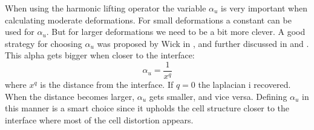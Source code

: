 When using the harmonic lifting operator the variable $\alpha_u$ is very important when calculating moderate deformations. For small deformations a constant can be used for $\alpha_u$. But for larger deformations we need to be a bit more clever. A good strategy for choosing $\alpha_u$ was proposed by Wick in \cite{Wick2011a}, and further discussed in \cite{Stein2003} and \cite{MM2016}. This alpha gets bigger when closer to the interface: 
\begin{equation}
\alpha_u = \frac{1}{x^q}
\end{equation}
where $x^q$ is the distance from the interface. If $q=0$ the laplacian i recovered. When the distance becomes larger, $\alpha_u$ gets smaller, and vice versa. 
Defining $\alpha_u$ in this manner is a smart choice since it upholds the cell structure closer to the interface where most of the cell distortion appears. 

